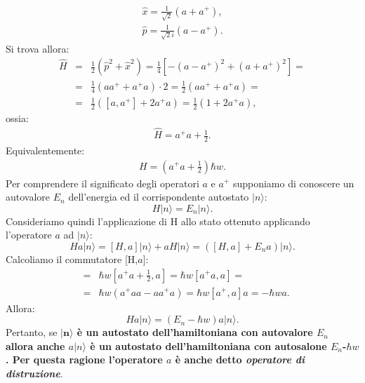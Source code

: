 \documentclass[a4paper,12pt,oneside]{book}
\begin{document}
\begin{equation} \label{eq:cap11_5}
\begin{split} 
	\hat{x}=\frac{1}{\sqrt{2} } (a+a^+), \\
	\hat{p}=\frac{1}{\sqrt{2}i } (a-a^+).
\end{split}
\end{equation}
Si trova allora:
\begin{eqnarray}
	\hat{H} &=& \frac{1}{2} (\hat{p}^2+\hat{x}^2)=  \frac{1}{4} \left[ -(a-a^+)^2+(a+a^+)^2  \right]= \nonumber\\
	&= &\frac{1}{4} (aa^++a^+a)\cdot 2= \frac{1}{2}(aa^++a^+a)= \nonumber\\
	&=&\frac{1}{2}( [a,a^+]+2a^+a  )=\frac{1}{2}(1+2a^+a ),
\end{eqnarray}
ossia:
\begin{equation} 
\begin{split}
	\hat{H} =a^+a +\frac{1}{2}.
\end{split}
\end{equation}
Equivalentemente:
\begin{equation} \label{eq:cap11_6}
\begin{split}
	H =(a^+a+ \frac{1}{2}) \hbar w.
\end{split}
\end{equation}
Per comprendere il significato degli operatori $a$ e $a^+$ supponiamo di conoscere un autovalore $E_n$  dell'energia ed il corrispondente autostato $|n \rangle$:
\begin{equation}
H|n\rangle=E_n|n\rangle.
\end{equation}
Consideriamo quindi l'applicazione di H allo stato ottenuto applicando l'operatore $a$ ad $|n\rangle$:
\begin{equation}
Ha|n\rangle= [H,a]|n \rangle+aH|n\rangle=([H,a]+E_na)|n\rangle.
\end{equation}
Calcoliamo il commutatore [H,$a$]:
\begin{eqnarray}
	[H,a]&=&\hbar w[a^+a+\frac{1}{2},a]=\hbar w [a^+a,a]= \nonumber\\
	&=&\hbar w (a^+aa-aa^+a)=\hbar w[a^+,a]a=-\hbar wa.
\end{eqnarray}
Allora:
\begin{equation}
Ha|n\rangle=(E_n-\hbar w)a|n\rangle.
\end{equation}
Pertanto, se \textbf{$\mathbf{|n\rangle}$ è un autostato dell'hamiltoniana con autovalore $E_n$ allora anche $a|n\rangle$ è  un autostato dell'hamiltoniana con autosalone $E_n$-$\hbar w$. Per questa ragione l'operatore $a$ è anche detto \textit{operatore di distruzione}}.  \\
\end{document}
